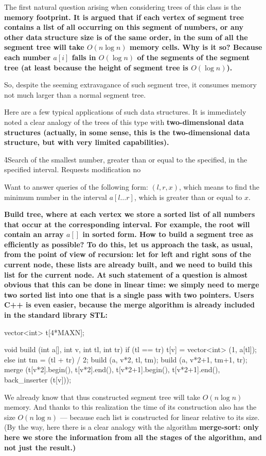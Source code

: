 The first natural question arising when considering trees of this class is the \bf{memory footprint}. It is argued that if each vertex of segment tree contains a list of all occurring on this segment of numbers, or any other data structure size is of the same order, in the sum of all the segment tree will take $O (n \log n)$ memory cells. Why is it so? Because each number $a[i]$ falls in $O (\log n)$ of the segments of the segment tree (at least because the height of segment tree is $O (\log n)$).

So, despite the seeming extravagance of such segment tree, it consumes memory not much larger than a normal segment tree.

Here are a few typical applications of such data structures. It is immediately noted a clear analogy of the trees of this type with \bf{two-dimensional data structures} (actually, in some sense, this is the two-dimensional data structure, but with very limited capabilities).

\h4{Search of the smallest number, greater than or equal to the specified, in the specified interval. Requests modification no}

Want to answer queries of the following form: $(l,r,x)$, which means to find the minimum number in the interval $a[l \ldots r]$, which is greater than or equal to $x$.

\bf{Build} tree, where at each vertex we store a sorted list of all numbers that occur at the corresponding interval. For example, the root will contain an array $a[]$ in sorted form. How to build a segment tree as efficiently as possible? To do this, let us approach the task, as usual, from the point of view of recursion: let for left and right sons of the current node, these lists are already built, and we need to build this list for the current node. At such statement of a question is almost obvious that this can be done in linear time: we simply need to merge two sorted list into one that is a single pass with two pointers. Users C++ is even easier, because the merge algorithm is already included in the standard library STL:

\code
vector<int> t[4*MAXN];

void build (int a[], int v, int tl, int tr) {
if (tl == tr)
t[v] = vector<int> (1, a[tl]);
else {
int tm = (tl + tr) / 2;
build (a, v*2, tl, tm);
build (a, v*2+1, tm+1, tr);
merge (t[v*2].begin(), t[v*2].end(), t[v*2+1].begin(), t[v*2+1].end(),
back_inserter (t[v]));
}
}
\endcode

We already know that thus constructed segment tree will take $O (n \log n)$ memory. And thanks to this realization the time of its construction also has the size $O (n \log n)$ --- because each list is constructed for linear relative to its size. (By the way, here there is a clear analogy with the algorithm \bf{merge-sort}: only here we store the information from all the stages of the algorithm, and not just the result.)

